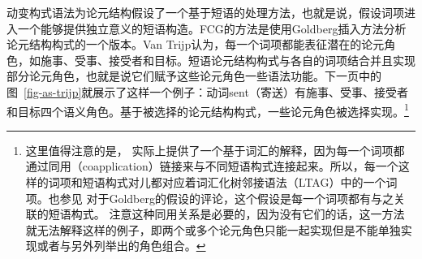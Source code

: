 动变构式语法为论元结构假设了一个基于短语的处理方法，也就是说，假设词项进入一个能够提供独立意义的短语构造\citep{vanTrijp2011a}。FCG的方法是使用Goldberg插入方法分析论元结构构式的一个版本\citep{Goldberg95a}。Van Trijp认为，每一个词项都能表征潜在的论元角色，如施事、受事、接受者和目标。短语论元结构构式与各自的词项结合并且实现部分论元角色，也就是说它们赋予这些论元角色一些语法功能。下一页中的图~\vref{fig-as-trijp}就展示了这样一个例子：动词sent（寄送）有施事、受事、接受者和目标四个语义角色。基于被选择的论元结构构式，一些论元角色被选择实现。\footnote{%
这里值得注意的是， \citet[]{vanTrijp2011a}实际上提供了一个基于词汇的解释，因为每一个词项都通过同用（coapplication）链接来与不同短语构式连接起来。所以，每一个这样的词项和短语构式对儿都对应着词汇化树邻接语法（LTAG）中的一个词项。也参见 对于Goldberg的假设的评论，这个假设是每一个词项都有与之关联的短语构式。
注意这种同用关系是必要的，因为没有它们的话，这一方法就无法解释这样的例子，即两个或多个论元角色只能一起实现但是不能单独实现或者与另外列举出的角色组合。
}

